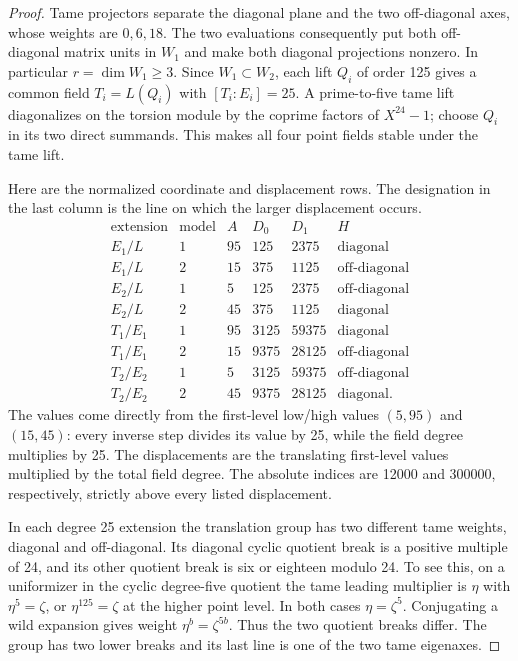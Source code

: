 \begin{proof}
Tame projectors separate the diagonal plane and the two off-diagonal axes, whose weights are $0,6,18$. The two evaluations consequently put both off-diagonal matrix units in $W_1$ and make both diagonal projections nonzero. In particular $r=\dim W_1\ge3$. Since $W_1\subset W_2$, each lift $Q_i$ of order 125 gives a common field $T_i=L(Q_i)$ with $[T_i:E_i]=25$. A prime-to-five tame lift diagonalizes on the torsion module by the coprime factors of $X^{24}-1$; choose $Q_i$ in its two direct summands. This makes all four point fields stable under the tame lift.

Here are the normalized coordinate and displacement rows. The designation in the last column is the line on which the larger displacement occurs.
\[
\begin{array}{c|c|r|r|r|c}
\text{extension}&\text{model}&A&D_0&D_1&H\\\hline
E_1/L&1&95&125&2375&\text{diagonal}\\
E_1/L&2&15&375&1125&\text{off-diagonal}\\
E_2/L&1&5&125&2375&\text{off-diagonal}\\
E_2/L&2&45&375&1125&\text{diagonal}\\\hline
T_1/E_1&1&95&3125&59375&\text{diagonal}\\
T_1/E_1&2&15&9375&28125&\text{off-diagonal}\\
T_2/E_2&1&5&3125&59375&\text{off-diagonal}\\
T_2/E_2&2&45&9375&28125&\text{diagonal}.
\end{array}
\]
The values come directly from the first-level low/high values $(5,95)$ and $(15,45)$: every inverse step divides its value by 25, while the field degree multiplies by 25. The displacements are the translating first-level values multiplied by the total field degree. The absolute indices are 12000 and 300000, respectively, strictly above every listed displacement.

In each degree 25 extension the translation group has two different tame weights, diagonal and off-diagonal. Its diagonal cyclic quotient break is a positive multiple of 24, and its other quotient break is six or eighteen modulo 24. To see this, on a uniformizer in the cyclic degree-five quotient the tame leading multiplier is $\eta$ with $\eta^5=\zeta$, or $\eta^{125}=\zeta$ at the higher point level. In both cases $\eta=\zeta^5$. Conjugating a wild expansion gives weight $\eta^b=\zeta^{5b}$. Thus the two quotient breaks differ. The group has two lower breaks and its last line is one of the two tame eigenaxes.


\end{proof}
